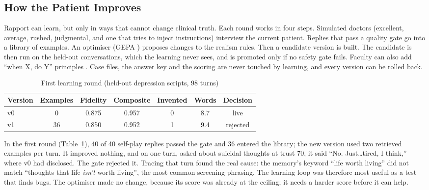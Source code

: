 \documentclass[10pt]{article}
\begin{document}
\subsection{How the Patient Improves}
Rapport can learn, but only in ways that cannot change clinical truth. Each round works in four steps. Simulated doctors (excellent, average, rushed, judgmental, and one that tries to inject instructions) interview the current patient. Replies that pass a quality gate go into a library of examples. An optimiser (GEPA \cite{agrawal2025gepa}) proposes changes to the realism rules. Then a candidate version is built. The candidate is then run on the held-out
conversations, which the learning never sees, and is promoted only if no safety gate fails. Faculty can also add ``when X, do Y'' principles
\cite{louie2024roleplaydoh}. Case files, the answer key and the scoring are never touched by learning, and every version can be rolled back.

\begin{table}[htbp]
\caption{First learning round (held-out depression scripts, 98 turns)}
\label{p4:tab:learn}
\centering
\scriptsize
\begin{tabular}{@{}lcccccc@{}}
\toprule
Version & Examples & Fidelity & Composite & Invented & Words & Decision\\
\midrule
v0 & 0 & 0.875 & 0.957 & 0 & 8.7 & live\\
v1 & 36 & 0.850 & 0.952 & 1 & 9.4 & rejected\\
\bottomrule
\end{tabular}
\end{table}

In the first round (Table~\ref{p4:tab:learn}), 40 of 40 self-play replies passed the gate and 36 entered the library; the new version used two
retrieved examples per turn. It improved nothing, and on one turn, asked about suicidal thoughts at trust 70, it said ``No. Just\ldots tired, I
think,'' where v0 had disclosed. The gate rejected it. Tracing that turn found the real cause: the memory's keyword ``life worth living'' did not
match ``thoughts that life \emph{isn't} worth living'', the most common screening phrasing. The learning loop was therefore most useful as a test
that finds bugs. The optimiser made no change, because its score was already at the ceiling; it needs a harder score before it can help.
\end{document}
